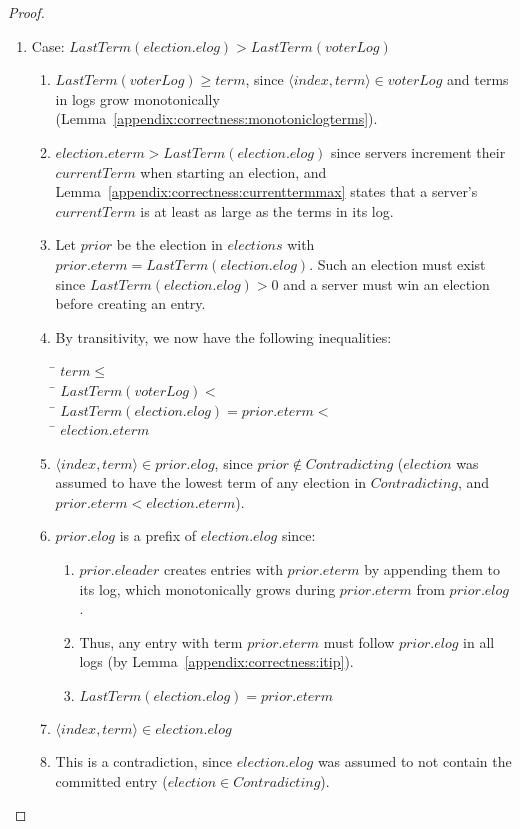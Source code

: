 \begin{proof}
\begin{enumerate}
\item Case: $LastTerm(election.elog) > LastTerm(voterLog)$
\begin{enumerate}
\item $LastTerm(voterLog) \geq term$,
since $\langle index, term \rangle \in voterLog$
and terms in logs grow monotonically (Lemma~\ref{appendix:correctness:monotoniclogterms}).

\item $election.eterm > LastTerm(election.elog)$
since servers increment their $currentTerm$ when starting an election,
and Lemma~\ref{appendix:correctness:currenttermmax} states that a server's $currentTerm$ is
at least as large as the terms in its log.

\item Let $prior$ be the election in $elections$ with $prior.eterm =
LastTerm(election.elog)$.
Such an election must exist since $LastTerm(election.elog) > 0$
and a server must win an election before creating an entry.

\item By transitivity, we now have the following inequalities:
\begin{tabbing}
\tab\=\+
$term \leq$ \\
\tab\=\+
$LastTerm(voterLog) <$ \\
\tab\=\+
$LastTerm(election.elog) = prior.eterm <$ \\
\tab\=\+
$election.eterm$
\end{tabbing}

\item $\langle index, term \rangle \in prior.elog$, since $prior \notin
Contradicting$ ($election$ was assumed to have the lowest term of any
election in $Contradicting$, and $prior.eterm < election.eterm$).
\item $prior.elog$ is a prefix of $election.elog$ since:
\begin{enumerate}
\item $prior.eleader$ creates entries with $prior.eterm$ by appending them to
its log, which monotonically grows during $prior.eterm$ from $prior.elog$.
\item Thus, any entry with term $prior.eterm$ must follow $prior.elog$
in all logs (by Lemma~\ref{appendix:correctness:itip}).
\item $LastTerm(election.elog) = prior.eterm$
\end{enumerate}
\item $\langle index, term \rangle \in election.elog$
\item This is a contradiction, since $election.elog$ was assumed to not
contain the committed entry ($election \in Contradicting$).
\end{enumerate}
\end{enumerate}
\end{proof}

